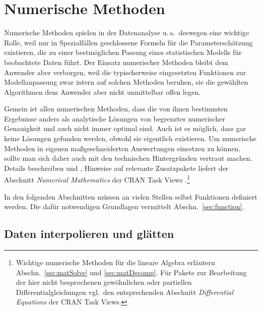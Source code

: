 \chapter{Numerische Methoden}
\label{sec:numerical}

Numerische Methoden spielen in der Datenanalyse u.\,a.\ deswegen eine wichtige Rolle, weil nur in Spezialfällen geschlossene Formeln für die Parameterschätzung existieren, die zu einer bestmöglichen Passung eines statistischen Modells für beobachtete Daten führt. Der Einsatz numerischer Methoden bleibt dem Anwender aber verborgen, weil die typischerweise eingesetzten Funktionen zur Modellanpassung zwar intern auf solchen Methoden beruhen, sie die gewählten Algorithmen dem Anwender aber nicht unmittelbar offen legen.

Gemein ist allen numerischen Methoden, dass die von ihnen bestimmten Ergebnisse anders als analytische Lösungen von begrenzter numerischer Genauigkeit und auch nicht immer optimal sind. Auch ist es möglich, dass gar keine Lösungen gefunden werden, obwohl sie eigentlich existieren. Um numerische Methoden in eigenen maßgeschneiderten Auswertungen einsetzen zu können, sollte man sich daher auch mit den technischen Hintergründen vertraut machen. Details beschreiben  und , Hinweise auf relevante Zusatzpakete liefert der Abschnitt \emph{Numerical Mathematics} der CRAN Task Views \cite{CRANtvNumerical}.\footnote{Wichtige numerische Methoden für die lineare Algebra erläutern Abschn.\ \ref{sec:matSolve} und \ref{sec:matDecomp}. Für Pakete zur Bearbeitung der hier nicht besprochenen gewöhnlichen oder partiellen Differentialgleichungen vgl.\ den entsprechenden Abschnitt \emph{Differential Equations} \cite{CRANtvDiffEq} der CRAN Task Views.}

In den folgenden Abschnitten müssen an vielen Stellen selbst Funktionen definiert werden. Die dafür notwendigen Grundlagen vermittelt Abschn.\ \ref{sec:function}.

\section{Daten interpolieren und glätten}
\label{sec:interpolate}

